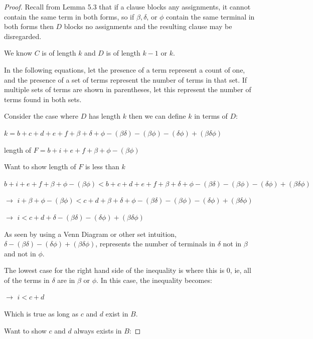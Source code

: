 \documentclass[manuscript]{acmart}
\begin{document}
\begin{proof}
        Recall from Lemma 5.3 that if a clause blocks any assignments, it cannot
        contain the same term in both forms, so if $\beta, \delta$, or $\phi$ contain
        the same terminal in both forms then $D$ blocks no assignments and the resulting
        clause may be disregarded.

        We know $C$ is of length $k$ and $D$ is of length $k - 1$ or $k$.

        In the following equations, let the presence of a term represent a count of one,
        and the presence of a set of terms represent the number of terms in that set. If
        multiple sets of terms are shown in parentheses, let this represent the number
        of terms found in both sets.

        Consider the case where $D$ has length $k$ then we can define $k$ in terms of $D$:
        
        $k = b + c + d + e + f + \beta + \delta + \phi - (\beta \delta) - 
        (\beta \phi) - (\delta \phi) + (\beta \delta \phi)$

        length of $F = b + i + e + f + \beta + \phi - (\beta \phi)$

        Want to show length of $F$ is less than $k$

        $b + i + e + f + \beta + \phi - (\beta \phi) < 
        b + c + d + e + f + \beta + \delta + \phi - (\beta \delta) - 
        (\beta \phi) - (\delta \phi) + (\beta \delta \phi)$

        $\rightarrow$ $i + \beta + \phi - (\beta \phi) < 
        c + d + \beta + \delta + \phi - (\beta \delta) - 
        (\beta \phi) - (\delta \phi) + (\beta \delta \phi)$

        $\rightarrow$ $i < 
        c + d + \delta - (\beta \delta) - (\delta \phi) + (\beta \delta \phi)$

        As seen by using a Venn Diagram or other set intuition, $\delta - 
        (\beta \delta) - (\delta \phi) + (\beta \delta \phi)$, 
        represents the number of terminals in $\delta$ not in $\beta$
        and not in $\phi$.

        The lowest case for the right hand side of the inequality is where 
        this is 0, ie, all of the terms in $\delta$ are in $\beta$ or 
        $\phi$. In this case, the inequality becomes:

        $\rightarrow$ $i < c + d$

        Which is true as long as $c$ and $d$ exist in $B$.

        Want to show $c$ and $d$ always exists in $B$:


\end{proof}
\end{document}
